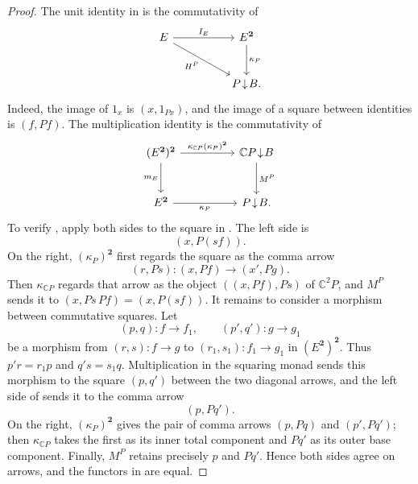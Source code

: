\documentclass[11pt]{article}
\theoremstyle{plain}
\theoremstyle{definition}
\theoremstyle{remark}
\newcommand{\C}{\mathbb{C}}
\numberwithin{equation}{section}
\begin{document}
\begin{proof}
The unit identity in  is the commutativity of
\begin{equation*}
\begin{tikzcd}[column sep=huge,row sep=large]
E \arrow[r,"I_E"] \arrow[dr,"H^P"']
& E^{\mathbf 2} \arrow[d,"\kappa_P"] \\
& P\!\downarrow\!B .
\end{tikzcd}
\end{equation*}
Indeed, the image of $1_x$ is $(x,1_{Px})$, and the image of a square
between identities is $(f,Pf)$.  The multiplication identity is the
commutativity of
\begin{equation}
\begin{tikzcd}[column sep=huge,row sep=large]
(E^{\mathbf 2})^{\mathbf 2}
  \arrow[r,"{\kappa_{\C P}(\kappa_P)^{\mathbf 2}}"]
  \arrow[d,"m_E"']
& \C P\!\downarrow\!B
  \arrow[d,"M^P"] \\
E^{\mathbf 2} \arrow[r,"\kappa_P"']
& P\!\downarrow\!B .
\end{tikzcd}
\label{eq:kappa-multiplication-diagram}
\end{equation}
To verify , apply both sides
to the square in .  The left side is
\begin{equation*}
(x,P(sf)).
\end{equation*}
On the right, $(\kappa_P)^{\mathbf 2}$ first regards the square as
the comma arrow
\begin{equation*}
(r,Ps)\colon(x,Pf)\longrightarrow(x',Pg).
\end{equation*}
Then $\kappa_{\C P}$ regards that arrow as the object
$((x,Pf),Ps)$ of $\C^2P$, and $M^{P}$ sends it to
$(x,Ps\,Pf)=(x,P(sf))$.  It remains to consider a morphism between
commutative squares.  Let
\begin{equation*}
  (p,q)\colon f\to f_1,
  \qquad
  (p',q')\colon g\to g_1
\end{equation*}
be a morphism from $(r,s)\colon f\to g$ to
$(r_1,s_1)\colon f_1\to g_1$ in $(E^{\mathbf 2})^{\mathbf 2}$.
Thus $p'r=r_1p$ and $q's=s_1q$.  Multiplication in the squaring monad
sends this morphism to the square $(p,q')$ between the two diagonal
arrows, and the left side of  sends it
to the comma arrow
\begin{equation*}
  (p,Pq').
\end{equation*}
On the right, $(\kappa_P)^{\mathbf 2}$ gives the pair of comma arrows
$(p,Pq)$ and $(p',Pq')$; then $\kappa_{\C P}$ takes the first as its
inner total component and $Pq'$ as its outer base component.  Finally,
$M^{P}$ retains precisely $p$ and $Pq'$.  Hence both sides agree on
arrows, and the functors in  are equal.
\end{proof}
\end{document}
